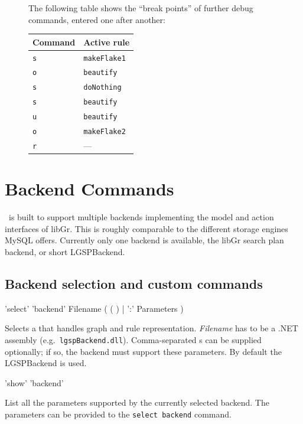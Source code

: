 \begin{figure}[htbp]
\begin{example}
\begin{center}
\end{center}
The following table shows the ``break points'' of further debug commands, entered one after another:
\begin{center}
  \begin{tabular}{|l|l|} \hline
    \textbf{Command} & \textbf{Active rule} \\ \hline
    \texttt{s} & \texttt{makeFlake1} \\
    \texttt{o} & \texttt{beautify} \\
    \texttt{s} & \texttt{doNothing} \\
    \texttt{s} & \texttt{beautify} \\ 
    \texttt{u} & \texttt{beautify} \\ 
    \texttt{o} & \texttt{makeFlake2} \\
    \texttt{r} & --- \\ \hline
  \end{tabular}
\end{center}
\end{example}   
\end{figure}


\section{Backend Commands}
\label{backend}

\GrG\ is built to support multiple backends implementing the model and action interfaces of libGr.
This is roughly comparable to the different storage engines MySQL offers.
Currently only one backend is available, the libGr search plan backend, or short LGSPBackend.

\subsection{Backend selection and custom commands}

\begin{rail}
  'select' 'backend' Filename ( ( ) | ':' Parameters )
\end{rail}
Selects a  that handles graph and rule representation.
\emph{Filename} has to be a .NET assembly (e.g.\ \texttt{lgspBackend.dll}).
Comma-separated s can be supplied optionally; if so, the backend must support these parameters.
By default the LGSPBackend is used.

\begin{rail}
  'show' 'backend'
\end{rail}\nopagebreak{}
List all the parameters supported by the currently selected backend.
The parameters can be provided to the \texttt{select backend} command.

